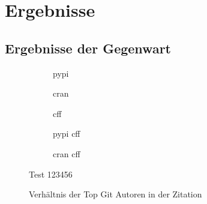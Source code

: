 \chapter{Ergebnisse}
\label{chap:ergebnisse}
\section{Ergebnisse der Gegenwart}
\label{sec:neuste_ergebnisse}
\begin{figure}
    \begin{subfigure}{.5\textwidth}
        \centering
        
        \caption{\gls{pypi}}
        \label{fig:common_authors_pypi}
    \end{subfigure}%
    \begin{subfigure}{.5\textwidth}
        \centering
        
        \caption{\gls{cran}}
        \label{fig:common_authors_cran}
    \end{subfigure}
    \begin{subfigure}{.5\textwidth}
        \centering
        
        \caption{\gls{cff}}
        \label{fig:common_authors_cff}
    \end{subfigure}%
    \begin{subfigure}{.5\textwidth}
        \centering
        
        \caption{\gls{pypi} \gls{cff}}
        \label{fig:common_authors_pypi_cff}
    \end{subfigure}
    \centering
    \begin{subfigure}{.5\textwidth}
        \centering
        
        \caption{\gls{cran} \gls{cff}}
        \label{fig:common_authors_cran_cff}
    \end{subfigure}
    \caption{Verhältnis der Top Git Autoren in der Zitation}
    \small
    Test 123456
\end{figure}

